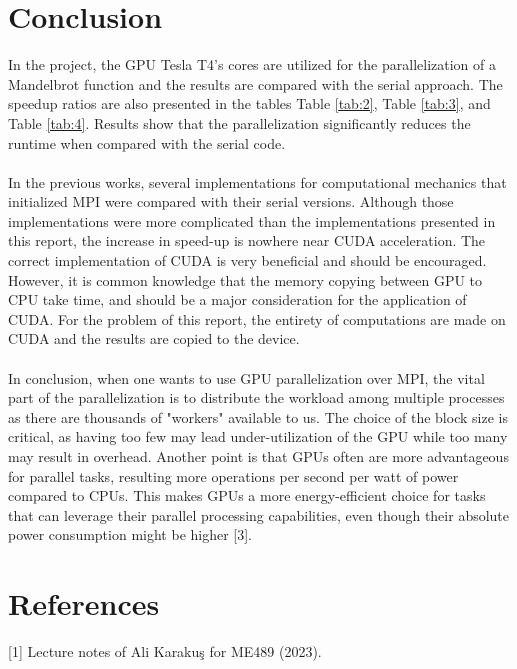 \documentclass[12pt]{article}
\begin{document}
\section{Conclusion}
In the project, the GPU Tesla T4's cores are utilized for the parallelization of a Mandelbrot function and the results are compared with the serial approach. The speedup ratios are also presented in the tables Table \ref{tab:2}, Table \ref{tab:3}, and Table \ref{tab:4}. Results show that the parallelization significantly reduces the runtime when compared with the serial code.\\\\
\noindent
In the previous works, several implementations for computational mechanics that initialized MPI were compared with their serial versions. Although those implementations were more complicated than the implementations presented in this report, the increase in speed-up is nowhere near CUDA acceleration. The correct implementation of CUDA is very beneficial and should be encouraged. However, it is common knowledge that the memory copying between GPU to CPU take time, and should be a major consideration for the application of CUDA. For the problem of this report, the entirety of computations are made on CUDA and the results are copied to the device.\\\\
\noindent
In conclusion, when one wants to use GPU parallelization over MPI, the vital part of the parallelization is to distribute the workload among multiple processes as there are thousands of "workers" available to us. The choice of the block size is critical, as having too few may lead under-utilization of the GPU while too many may result in overhead. Another point is that GPUs often are more advantageous for parallel tasks, resulting more operations per second per watt of power compared to CPUs. This makes GPUs a more energy-efficient choice for tasks that can leverage their parallel processing capabilities, even though their absolute power consumption might be higher [3].
\noindent

\newpage
\section{References}

[1] Lecture notes of Ali Karakuş for ME489 (2023).
\\
\newline
[2] 
\\
\newline
[3] 
\end{document}
